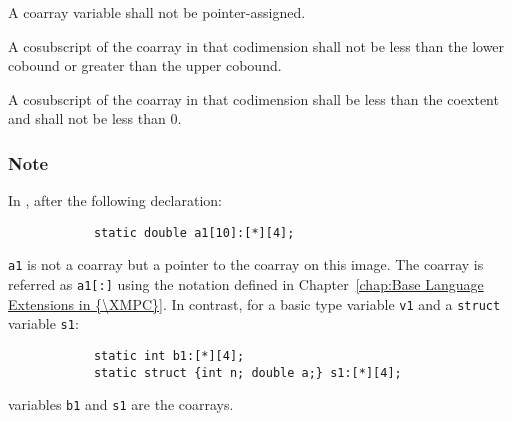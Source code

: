 \begin{Constraints C}
\item A coarray variable shall not be pointer-assigned.
\end{Constraints C}

{\onlyF}
A cosubscript of the coarray in that codimension shall not be less than the lower
cobound or greater than the upper cobound.

{\onlyC}
A cosubscript of the coarray in that codimension shall be less than the coextent
and shall not be less than 0.


\subsubsection*{Note}
In {\XMPC}, after the following declaration:
\begin{verbatim}
            static double a1[10]:[*][4];
\end{verbatim}
{\tt a1} is not a coarray but a pointer to the coarray on this image.
The coarray is referred as {\tt a1[:]} using the notation defined in 
Chapter~\ref{chap:Base Language Extensions in {\XMPC}}.
In contrast, for a basic type variable {\tt v1} and a {\tt struct} 
variable {\tt s1}:
\begin{verbatim}
            static int b1:[*][4];
            static struct {int n; double a;} s1:[*][4];
\end{verbatim}
variables {\tt b1} and {\tt s1} are the coarrays.
